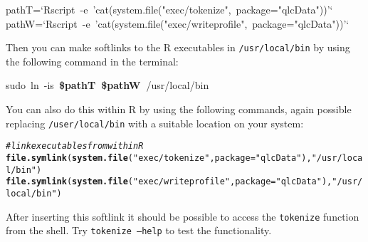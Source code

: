 \documentclass[output=book,nonflat,modfonts,
citecolor=brown,
		]{langsci/langscibook}\usepackage[]{graphicx}\usepackage[]{color}
\makeatletter
\newcommand{\hlstr}[1]{\textcolor[rgb]{0.192,0.494,0.8}{#1}}%
\newcommand{\hlcom}[1]{\textcolor[rgb]{0.678,0.584,0.686}{\textit{#1}}}%
\newcommand{\hlopt}[1]{\textcolor[rgb]{0,0,0}{#1}}%
\newcommand{\hlstd}[1]{\textcolor[rgb]{0.345,0.345,0.345}{#1}}%
\newcommand{\hlkwb}[1]{\textcolor[rgb]{0.69,0.353,0.396}{#1}}%
\newcommand{\hlkwc}[1]{\textcolor[rgb]{0.333,0.667,0.333}{#1}}%
\newcommand{\hlkwd}[1]{\textcolor[rgb]{0.737,0.353,0.396}{\textbf{#1}}}%
\newenvironment{kframe}{%
 \def\at@end@of@kframe{}%
 \ifinner\ifhmode%
  \def\at@end@of@kframe{\end{minipage}}%
  \begin{minipage}{\columnwidth}%
 \fi\fi%
 \def\FrameCommand##1{\hskip\@totalleftmargin \hskip-\fboxsep
 \colorbox{shadecolor}{##1}\hskip-\fboxsep
     \hskip-\linewidth \hskip-\@totalleftmargin \hskip\columnwidth}%
 \MakeFramed {\advance\hsize-\width
   \@totalleftmargin\z@ \linewidth\hsize
   \@setminipage}}%
 {\par\unskip\endMakeFramed%
 \at@end@of@kframe}
\newenvironment{knitrout}{}{} %
\makeatother
\begin{document}
\begin{knitrout}\footnotesize
{}\color{fgcolor}\begin{kframe}
\noindent
\ttfamily
\hlstd{pathT}\hlopt{=}\hlstd{}\hlstr{`Rscript\ {-}e\ 'cat(system.file("exec/tokenize",\ package="qlcData"))'`}\hlstd{}\hspace*{\fill}\\
\hlstd{pathW}\hlopt{=}\hlstd{}\hlstr{`Rscript\ {-}e\ 'cat(system.file("exec/writeprofile",\ package="qlcData"))'`}\hlstd{}\hspace*{\fill}
\mbox{}
\normalfont
\end{kframe}
\end{knitrout}

Then you can make softlinks to the R executables in \texttt{/usr/local/bin} by using the following command in the terminal:

\begin{knitrout}\footnotesize
{}\color{fgcolor}\begin{kframe}
\noindent
\ttfamily
\hlstd{sudo\ }\hlkwc{ln\ }\hlstd{}\hlkwb{{-}is\ }\hlstd{}\hlkwd{\$pathT\ \$pathW\ }\hlstd{}\hlopt{/}\hlstd{usr}\hlopt{/}\hlstd{local}\hlopt{/}\hlstd{bin}\hspace*{\fill}
\mbox{}
\normalfont
\end{kframe}
\end{knitrout}

You can also do this within R by using the following commands, again possible replacing \texttt{/user/local/bin} with a suitable location on your system:

\begin{knitrout}\footnotesize
{}\color{fgcolor}\begin{kframe}
\begin{alltt}
\hlcom{# link executables from within R}
\hlkwd{file.symlink}\hlstd{(}\hlkwd{system.file}\hlstd{(}\hlstr{"exec/tokenize"}\hlstd{,} \hlkwc{package} \hlstd{=} \hlstr{"qlcData"}\hlstd{),} \hlstr{"/usr/local/bin"}\hlstd{)}
\hlkwd{file.symlink}\hlstd{(}\hlkwd{system.file}\hlstd{(}\hlstr{"exec/writeprofile"}\hlstd{,} \hlkwc{package} \hlstd{=} \hlstr{"qlcData"}\hlstd{),} \hlstr{"/usr/local/bin"}\hlstd{)}
\end{alltt}
\end{kframe}
\end{knitrout}

After inserting this softlink it should be possible to access the
\texttt{tokenize} function from the shell. Try \texttt{tokenize --help} to test
the functionality.
\end{document}
